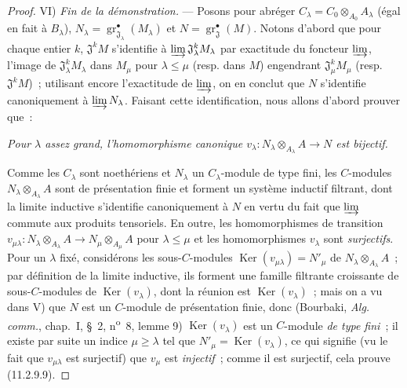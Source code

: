 \begin{proof}
\medskip
\noindent VI) \emph{Fin de la démonstration.} --- Posons pour abréger
$C_\lambda=C_0\otimes_{A_0}A_\lambda$ (égal en fait à $B_\lambda$),
$N_\lambda=\operatorname{gr}_{\mathfrak J_\lambda}^\bullet(M_\lambda)$ et
$N=\operatorname{gr}_{\mathfrak J}^\bullet(M)$. Notons d'abord que pour chaque
entier $k$, $\mathfrak J^kM$ s'identifie à
$\varinjlim\mathfrak J_\lambda^kM_\lambda$ par exactitude du foncteur
$\varinjlim$, l'image de $\mathfrak J_\lambda^kM_\lambda$ dans $M_\mu$ pour
$\lambda\leq\mu$ (resp. dans $M$) engendrant $\mathfrak J_\mu^kM_\mu$
(resp. $\mathfrak J^kM$)~; utilisant encore l'exactitude de $\varinjlim$, on
en conclut que $N$ s'identifie canoniquement à $\varinjlim N_\lambda$. Faisant
cette identification, nous allons d'abord prouver que~:

\begin{env}[11.2.9.9]
\label{IV.11.2.9.9-fr}
\emph{Pour $\lambda$ assez grand, l'homomorphisme canonique
$v_\lambda:N_\lambda\otimes_{A_\lambda}A\to N$ est bijectif.}
\end{env}

Comme les $C_\lambda$ sont noethériens et $N_\lambda$ un $C_\lambda$-module
de type fini, les $C$-modules $N_\lambda\otimes_{A_\lambda}A$ sont de
présentation finie et forment un système inductif filtrant, dont la limite
inductive s'identifie canoniquement à $N$ en vertu du fait que $\varinjlim$
commute aux produits tensoriels. En outre, les homomorphismes de transition
$v_{\mu\lambda}:N_\lambda\otimes_{A_\lambda}A
\to N_\mu\otimes_{A_\mu}A$
pour $\lambda\leq\mu$ et les homomorphismes $v_\lambda$ sont \emph{surjectifs}.
Pour un $\lambda$ fixé, considérons les sous-$C$-modules
$\operatorname{Ker}(v_{\mu\lambda})=N'_\mu$ de $N_\lambda\otimes_{A_\lambda}A$~; par
définition de la limite inductive, ils forment une famille filtrante croissante
de sous-$C$-modules de $\operatorname{Ker}(v_\lambda)$, dont la réunion est
$\operatorname{Ker}(v_\lambda)$~; mais on a vu dans V) que $N$ est un $C$-module de
présentation finie, donc (Bourbaki, \emph{Alg. comm.}, chap.~I, \S~2,
n\textsuperscript{o}~8, lemme 9) $\operatorname{Ker}(v_\lambda)$ est un $C$-module \emph{de type fini}~; il
existe par suite un indice $\mu\geq\lambda$ tel que
$N'_\mu=\operatorname{Ker}(v_\lambda)$, ce qui signifie (vu le fait que $v_{\mu\lambda}$ est
surjectif) que $v_\mu$ est \emph{injectif}~; comme il est surjectif, cela
prouve (11.2.9.9).


\end{proof}
